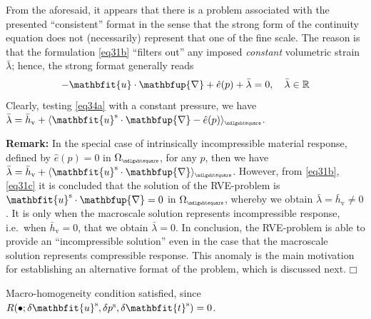 \documentclass[12pt,a4paper]{article}
\renewcommand{\ta}[1]{\mathbfit{#1}}
\renewcommand{\diff}{\mathbfup{\nabla}}
\renewcommand{\Box}{\mdlgwhtsquare}
\DeclarePairedDelimiter{\homgen}{\langle}{\rangle_\rve}
\renewcommand{\vol}{\mathrm{v}}
\newcommand{\rve}{
  {\mathchoice
   {\mbox{\scalebox{0.67}{$\Box$}}}
   {\mbox{\scalebox{0.67}{$\Box$}}}
   {\mbox{\scalebox{0.5}{$\Box$}}}
   {\mbox{\scalebox{0.375}{$\Box$}}}
  }
}
\begin{document}
From the aforesaid, it appears that there is a problem associated with the presented ``consistent'' format in the sense that the strong form of the continuity equation does not (necessarily) represent that one of the fine scale.
The reason is that the formulation \cref{eq31b} ``filters out'' any imposed \emph{constant} volumetric strain $\bar{\lambda}$; hence, the strong format generally reads
\begin{equation}
    - \ta{u}\cdot\diff + \hat{e}(p) + \bar{\lambda} = 0, \quad \bar{\lambda}\in\set{R}
\label{eq34a}
\end{equation}
Clearly, testing \cref{eq34a} with a constant pressure, we have $\bar{\lambda}=\bar{h}_\vol+\homgen{\ta{u}^\fluct\cdot\diff-\hat{e}(p)}$.

\textbf{Remark:} In the special case of intrinsically incompressible material response, defined by $\hat{e}(p)=0$ in $\Omega_\rve$, for any $p$, then we have  $\bar{\lambda}=\bar{h}_\vol+\homgen{\ta{u}^\fluct\cdot\diff}$.
However, from \cref{eq31b}, \cref{eq31c} it is concluded that the solution of the RVE-problem is $\ta{u}^\fluct\cdot\diff=0$ in $\Omega_\rve$, whereby we obtain $\bar{\lambda}=\bar{h}_\vol \neq 0$.
It is only when the macroscale solution represents incompressible response, i.e.\ when $\bar{h}_\vol = 0$, that we obtain $\bar{\lambda} = 0$.
In conclusion, the RVE-problem is able to provide an ``incompressible solution'' even in the case that the macroscale solution represents compressible response.
This anomaly is the main motivation for establishing an alternative format of the problem, which is discussed next. $\Box$

Macro-homogeneity condition satisfied, since $R(\bullet;\delta\ta u^\fluct, \delta p^\fluct, \delta\ta t^\fluct) = 0$.
\end{document}
